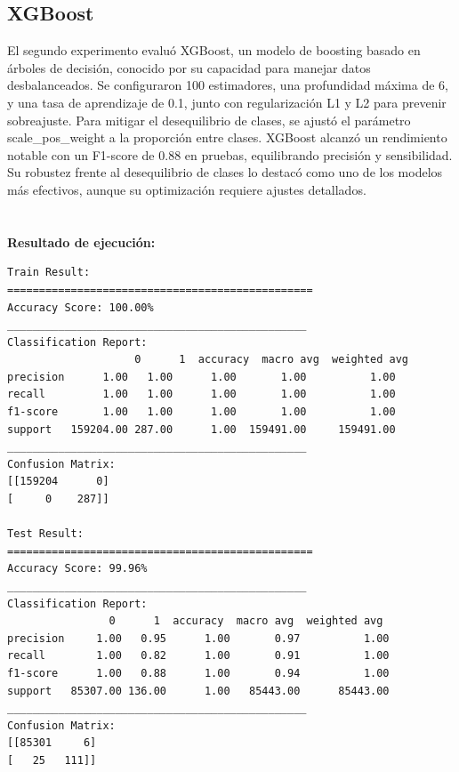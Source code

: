 \documentclass[9pt,a4paper,twoside]{rho-class/rho}
\begin{document}
        \subsection{XGBoost}
            El segundo experimento evaluó XGBoost, un modelo de boosting basado en árboles de decisión, conocido por su capacidad para manejar datos desbalanceados. Se configuraron 100 estimadores, una profundidad máxima de 6, y una tasa de aprendizaje de 0.1, junto con regularización L1 y L2 para prevenir sobreajuste. Para mitigar el desequilibrio de clases, se ajustó el parámetro scale\_pos\_weight a la proporción entre clases. XGBoost alcanzó un rendimiento notable con un F1-score de 0.88 en pruebas, equilibrando precisión y sensibilidad. Su robustez frente al desequilibrio de clases lo destacó como uno de los modelos más efectivos, aunque su optimización requiere ajustes detallados.
            \\\\\\
            \textbf{Resultado de ejecución:}\\
\small
\begin{verbatim}
Train Result:
================================================
Accuracy Score: 100.00%
_______________________________________________
Classification Report:
                    0      1  accuracy  macro avg  weighted avg
precision      1.00   1.00      1.00       1.00          1.00
recall         1.00   1.00      1.00       1.00          1.00
f1-score       1.00   1.00      1.00       1.00          1.00
support   159204.00 287.00      1.00  159491.00     159491.00
_______________________________________________
Confusion Matrix: 
[[159204      0]
[     0    287]]

Test Result:
================================================
Accuracy Score: 99.96%
_______________________________________________
Classification Report:
                0      1  accuracy  macro avg  weighted avg
precision     1.00   0.95      1.00       0.97          1.00
recall        1.00   0.82      1.00       0.91          1.00
f1-score      1.00   0.88      1.00       0.94          1.00
support   85307.00 136.00      1.00   85443.00      85443.00
_______________________________________________
Confusion Matrix: 
[[85301     6]
[   25   111]]
\end{verbatim}
\normalsize
\end{document}
